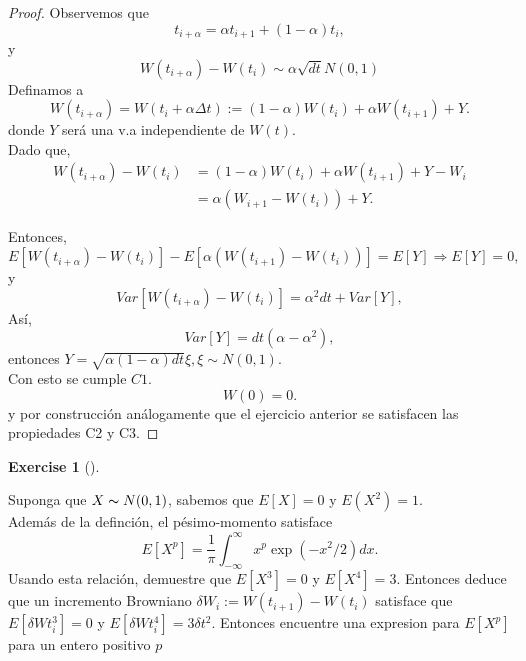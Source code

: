 \documentclass[
  letterpaper,
  DIV=11,
  numbers=noendperiod]{scrreprt}
\theoremstyle{plain}
\theoremstyle{definition}
\newtheorem{exercise}{Exercise}[chapter]
\theoremstyle{remark}
\begin{document}
\begin{proof}

Observemos que \[
t_{i+\alpha}=\alpha t_{i+1}+(1-\alpha)t_{i},
\] y \[
W(t_{i+\alpha})-W(t_{i}) \sim \alpha\sqrt{ dt}N(0,1)
\] Definamos a \[
W(t_{i+\alpha})=W\left(t_{i}+\alpha\Delta t\right) :=\left(1-\alpha\right)W(t_{i})+\alpha W(t_{i+1})+Y.
\] donde \(Y\) será una v.a independiente de \(W\left(t\right)\).\\
Dado que, \[
\begin{align*}
W(t_{i+\alpha})-W(t_{i}) & =\left(1-\alpha\right)W(t_{i})+\alpha W(t_{i+1})+Y-W_{i}\\
 & =\alpha\left(W_{i+1}-W(t_{i})\right)+Y.
\end{align*}
\]

Entonces, \[
E\left[W(t_{i+\alpha})-W(t_{i})\right]-E[\alpha\left(W(t_{i+1})-W(t_{i})\right)]=E\left[Y\right]\Longrightarrow E[Y]=0,
\] y \[
Var\left[W(t_{i+\alpha})-W(t_{i})\right]=\alpha^{2}d t+Var\left[Y\right],
\] Así, \[
Var\left[Y\right]=d t\left(\alpha-\alpha^{2}\right),
\] entonces
\(Y=\sqrt{\alpha\left(1-\alpha\right)dt}\xi,\xi\sim N\left(0,1\right)\).\\
Con esto se cumple \(C1\). \[
W\left(0\right)=0.
\] y por construcción análogamente que el ejercicio anterior se
satisfacen las propiedades C2 y C3.

\end{proof}

\begin{exercise}[]\protect\hypertarget{exr-4}{}\label{exr-4}

Suponga que \(X\thicksim N(0,1)\), sabemos que \(E[X]=0\) y
\(E(X^{2})=1\).\\
Además de la definción, el pésimo-momento satisface \[
E[X^{p}]=\frac{1}{\pi}\int_{-\infty}^{\infty}x^{p}\exp(-x^{2}/2)dx.
\] Usando esta relación, demuestre que \(E[X^{3}]=0\) y \(E[X^{4}]=3\).
Entonces deduce que un incremento Browniano
\(\delta W_{i}:=W(t_{i+1})-W(t_{i})\) satisface que
\(E[\delta Wt_{i}^{3}]=0\) y \(E[\delta Wt_{i}^{4}]=3\delta t^{2}\).
Entonces encuentre una expresion para \(E[X^{p}]\) para un entero
positivo \(p\)

\end{exercise}
\end{document}

